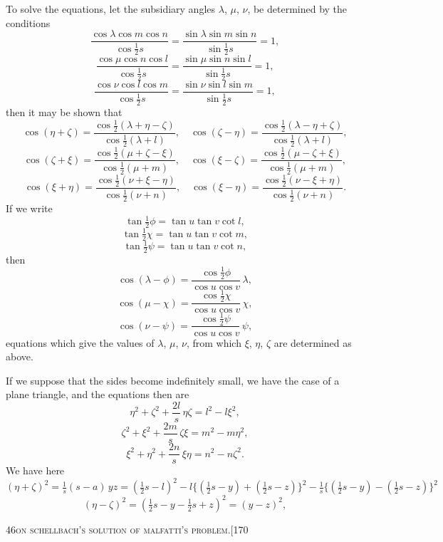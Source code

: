 \documentclass[11pt]{article}
\begin{document}
\medskip

\noindent To solve the equations, let the subsidiary angles $\lambda$, $\mu$, $\nu$, be determined by the
conditions
\[
\frac{\cos\lambda \cos m \cos n}{\cos\tfrac{1}{2} s} = \frac{\sin\lambda \sin m \sin n}{\sin\tfrac{1}{2} s} = 1,
\]
\[
\frac{\cos\mu \cos n \cos l}{\cos\tfrac{1}{2} s} = \frac{\sin\mu \sin n \sin l}{\sin\tfrac{1}{2} s} = 1,
\]
\[
\frac{\cos\nu \cos l \cos m}{\cos\tfrac{1}{2} s} = \frac{\sin\nu \sin l \sin m}{\sin\tfrac{1}{2} s} = 1,
\]
then it may be shown that
\[
\cos(\eta + \zeta) = \frac{\cos\tfrac{1}{2}(\lambda + \eta - \zeta)}{\cos\tfrac{1}{2}(\lambda + l)},\quad
\cos(\zeta - \eta) = \frac{\cos\tfrac{1}{2}(\lambda - \eta + \zeta)}{\cos\tfrac{1}{2}(\lambda + l)},
\]
\[
\cos(\zeta + \xi) = \frac{\cos\tfrac{1}{2}(\mu + \zeta - \xi)}{\cos\tfrac{1}{2}(\mu + m)},\quad
\cos(\xi - \zeta) = \frac{\cos\tfrac{1}{2}(\mu - \zeta + \xi)}{\cos\tfrac{1}{2}(\mu + m)},
\]
\[
\cos(\xi + \eta) = \frac{\cos\tfrac{1}{2}(\nu + \xi - \eta)}{\cos\tfrac{1}{2}(\nu + n)},\quad
\cos(\xi - \eta) = \frac{\cos\tfrac{1}{2}(\nu - \xi + \eta)}{\cos\tfrac{1}{2}(\nu + n)}.
\]
If we write
\[
\tan\tfrac{1}{2}\phi = \tan u \tan v \cot l,
\]
\[
\tan\tfrac{1}{2}\chi = \tan u \tan v \cot m,
\]
\[
\tan\tfrac{1}{2}\psi = \tan u \tan v \cot n,
\]
then
\[
\cos(\lambda - \phi) = \frac{\cos\tfrac{1}{2}\phi}{\cos u \cos v}\,\lambda,
\]
\[
\cos(\mu - \chi) = \frac{\cos\tfrac{1}{2}\chi}{\cos u \cos v}\,\chi,
\]
\[
\cos(\nu - \psi) = \frac{\cos\tfrac{1}{2}\psi}{\cos u \cos v}\,\psi,
\]
equations which give the values of $\lambda$, $\mu$, $\nu$, from which $\xi$, $\eta$, $\zeta$ are determined as above.

If we suppose that the sides become indefinitely small, we have the case of a
plane triangle, and the equations then are
\[
\eta^{2} + \zeta^{2} + \frac{2 l}{s}\,\eta\zeta = l^{2} - l\xi^{2},
\]
\[
\zeta^{2} + \xi^{2} + \frac{2 m}{s}\,\zeta\xi = m^{2} - m\eta^{2},
\]
\[
\xi^{2} + \eta^{2} + \frac{2 n}{s}\,\xi\eta = n^{2} - n\zeta^{2}.
\]
We have here
\[
(\eta + \zeta)^{2} = \tfrac{1}{s}(s - a)\,yz = (\tfrac{1}{2}s - l)^{2}
- l\bigl\{(\tfrac{1}{2}s - y) + (\tfrac{1}{2}s - z)\bigr\}^{2} - \tfrac{1}{s}\bigl\{(\tfrac{1}{2}s - y) - (\tfrac{1}{2}s - z)\bigr\}^{2}
\]
\[
(\eta - \zeta)^{2} = (\tfrac{1}{2}s - y - \tfrac{1}{2}s + z)^{2} = (y - z)^{2},
\]

\newpage

\begin{center}
\small\textsc{46}\hfill\textsc{on schellbach's solution of malfatti's problem.}\hfill[170
\end{center}
\end{document}
